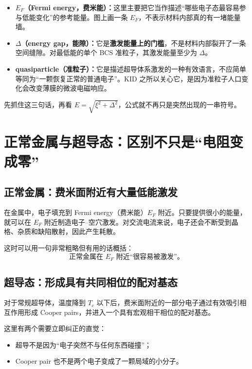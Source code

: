 \documentclass[11pt,a4paper,openany]{ctexrep}
\begin{document}
\begin{tcolorbox}[colback=KidTeal!5,colframe=KidTeal!70!black,boxrule=0.7pt,arc=2mm,title=在看能带图之前，先把三个词翻成普通话,fonttitle=\bfseries]
\begin{itemize}
  \item \textbf{$E_F$（Fermi energy，费米能）：}这里主要把它当作描述“哪些电子态最容易参与低能变化”的参考能量。图上画一条 $E_F$，不表示材料内部真的有一堵能量墙。
  \item \textbf{$\Delta$（energy gap，能隙）：}它是\textbf{激发能量上的门槛}，不是材料内部裂开了一条空间缝隙。对最低能的单个 BCS 准粒子，其激发能量至少为 $\Delta$。
  \item \textbf{quasiparticle（准粒子）：}它是描述超导体系激发的一种有效语言，不应简单等同为“一颗恢复正常的普通电子”。KID 之所以关心它，是因为准粒子人口变化会改变薄膜的微波电磁响应。
\end{itemize}
先抓住这三句话，再看 $E=\sqrt{\xi^2+\Delta^2}$，公式就不再只是突然出现的一串符号。
\end{tcolorbox}

\section{正常金属与超导态：区别不只是“电阻变成零”}

\subsection{正常金属：费米面附近有大量低能激发}
在金属中，电子填充到 Fermi energy（费米能）$E_F$ 附近。只要提供很小的能量，就可以在 $E_F$ 附近制造电子--空穴激发。对交流电流来说，电子还会不断受到晶格、杂质和缺陷散射，因此产生耗散。

这时可以用一句非常粗略但有用的话概括：
\[
\boxed{\text{正常金属在 }E_F\text{ 附近“很容易被激发”。}}
\]

\subsection{超导态：形成具有共同相位的配对基态}
对于常规超导体，温度降到 $T_c$ 以下后，费米面附近的一部分电子通过有效吸引相互作用形成 Cooper pairs，并进入一个具有宏观相干相位的配对基态。

这里有两个需要立即纠正的直觉：
\begin{itemize}
  \item 超导不是因为“电子突然不与任何东西碰撞”；
  \item Cooper pair 也不是两个电子变成了一颗局域的小分子。
\end{itemize}
\end{document}
